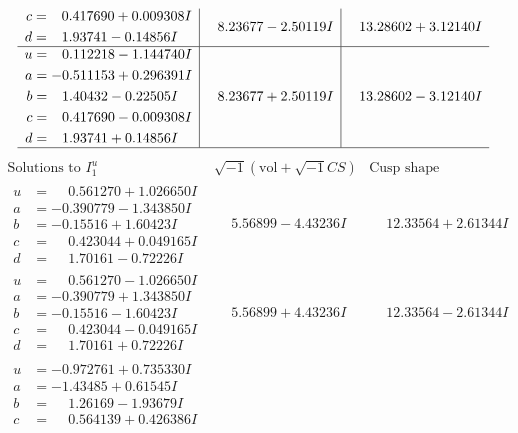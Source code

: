 \documentclass[1p]{elsarticle_modified}
\theoremstyle{definition}
\newcommand{\I}{\sqrt{-1}}
\begin{document}
$$\begin{array}{c|c|c}
\begin{aligned}
c &= \phantom{-}0.417690 + 0.009308 I \\
d &= \phantom{-}1.93741 - 0.14856 I\end{aligned}
 & \phantom{-}8.23677 - 2.50119 I & \phantom{-}13.28602 + 3.12140 I \\ \hline\begin{aligned}
u &= \phantom{-}0.112218 - 1.144740 I \\
a &= -0.511153 + 0.296391 I \\
b &= \phantom{-}1.40432 - 0.22505 I \\
c &= \phantom{-}0.417690 - 0.009308 I \\
d &= \phantom{-}1.93741 + 0.14856 I\end{aligned}
 & \phantom{-}8.23677 + 2.50119 I & \phantom{-}13.28602 - 3.12140 I\\
 \hline 
 \end{array}$$\newpage$$\begin{array}{c|c|c}  
\text{Solutions to }I^u_{1}& \I (\text{vol} + \sqrt{-1}CS) & \text{Cusp shape}\\
 \hline 
\begin{aligned}
u &= \phantom{-}0.561270 + 1.026650 I \\
a &= -0.390779 - 1.343850 I \\
b &= -0.15516 + 1.60423 I \\
c &= \phantom{-}0.423044 + 0.049165 I \\
d &= \phantom{-}1.70161 - 0.72226 I\end{aligned}
 & \phantom{-}5.56899 - 4.43236 I & \phantom{-}12.33564 + 2.61344 I \\ \hline\begin{aligned}
u &= \phantom{-}0.561270 - 1.026650 I \\
a &= -0.390779 + 1.343850 I \\
b &= -0.15516 - 1.60423 I \\
c &= \phantom{-}0.423044 - 0.049165 I \\
d &= \phantom{-}1.70161 + 0.72226 I\end{aligned}
 & \phantom{-}5.56899 + 4.43236 I & \phantom{-}12.33564 - 2.61344 I \\ \hline\begin{aligned}
u &= -0.972761 + 0.735330 I \\
a &= -1.43485 + 0.61545 I \\
b &= \phantom{-}1.26169 - 1.93679 I \\
c &= \phantom{-}0.564139 + 0.426386 I \\

\end{aligned}
\end{array}$$
\end{document}
